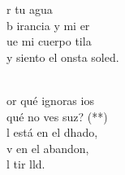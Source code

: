 \begin{cancion}[Saulo][Nico]
	 r tu agua\\
	b irancia y mi er\\
	ue mi cuerpo tila \\
	y siento el onsta soled.\\\jump\\
	\begin{chorus}%
	or qué ignoras ios\\
	qué no ves suz? (**)\\
	l está en el dhado,\\
	v en el abandon,\\
	l tir lld.\\
	\end{chorus}%
	\jump\\
\end{cancion}%
